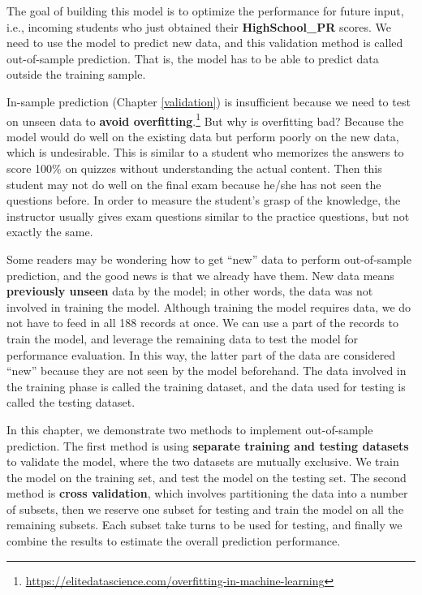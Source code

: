 \documentclass[
]{article}
\begin{document}
The goal of building this model is to optimize the performance for
future input, i.e., incoming students who just obtained their
\textbf{HighSchool\_PR} scores. We need to use the model to predict new
data, and this validation method is called out-of-sample prediction.
That is, the model has to be able to predict data outside the training
sample.

In-sample prediction (Chapter \ref{validation}) is insufficient because
we need to test on unseen data to \textbf{avoid overfitting}.\footnote{\url{https://elitedatascience.com/overfitting-in-machine-learning}}
But why is overfitting bad? Because the model would do well on the
existing data but perform poorly on the new data, which is undesirable.
This is similar to a student who memorizes the answers to score 100\% on
quizzes without understanding the actual content. Then this student may
not do well on the final exam because he/she has not seen the questions
before. In order to measure the student's grasp of the knowledge, the
instructor usually gives exam questions similar to the practice
questions, but not exactly the same.

Some readers may be wondering how to get ``new'' data to perform
out-of-sample prediction, and the good news is that we already have
them. New data means \textbf{previously unseen} data by the model; in
other words, the data was not involved in training the model. Although
training the model requires data, we do not have to feed in all 188
records at once. We can use a part of the records to train the model,
and leverage the remaining data to test the model for performance
evaluation. In this way, the latter part of the data are considered
``new'' because they are not seen by the model beforehand. The data
involved in the training phase is called the training dataset, and the
data used for testing is called the testing dataset.

In this chapter, we demonstrate two methods to implement out-of-sample
prediction. The first method is using \textbf{separate training and
testing datasets} to validate the model, where the two datasets are
mutually exclusive. We train the model on the training set, and test the
model on the testing set. The second method is \textbf{cross
validation}, which involves partitioning the data into a number of
subsets, then we reserve one subset for testing and train the model on
all the remaining subsets. Each subset take turns to be used for
testing, and finally we combine the results to estimate the overall
prediction performance.
\end{document}

